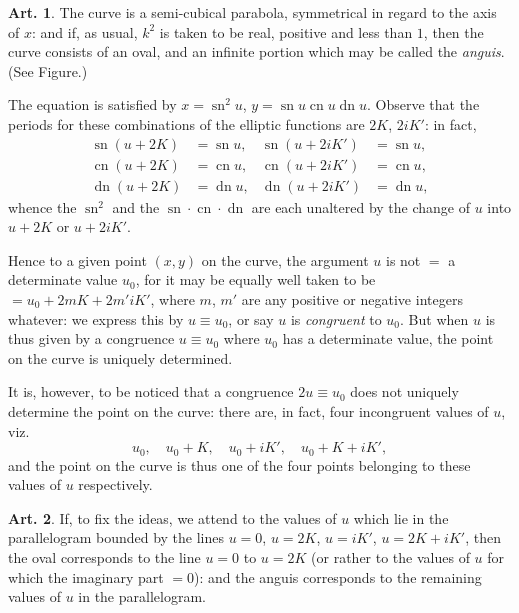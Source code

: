 \documentclass[12pt,a4paper]{article}
\theoremstyle{definition}
\newtheorem{art}{Art.}[section]
\DeclareMathOperator{\sn}{sn}
\DeclareMathOperator{\cn}{cn}
\DeclareMathOperator{\dn}{dn}
\begin{document}
\begin{art}\label{art:120}
The curve is a semi-cubical parabola, symmetrical in regard to the axis of $x$: and if, as usual, $k^2$ is taken to be real, positive and less than $1$, then the curve consists of an oval, and an infinite portion which may be called the \textit{anguis}. (See Figure.)

The equation is satisfied by $x = \sn^2 u$, $y = \sn u \cn u \dn u$. Observe that the periods for these combinations of the elliptic functions are $2K$, $2iK'$: in fact,
\begin{align*}
\sn(u + 2K) &= \sn u, & \sn(u + 2iK') &= \sn u,\\
\cn(u + 2K) &= \cn u, & \cn(u + 2iK') &= \cn u,\\
\dn(u + 2K) &= \dn u, & \dn(u + 2iK') &= \dn u,
\end{align*}
whence the $\sn^2$ and the $\sn \cdot \cn \cdot \dn$ are each unaltered by the change of $u$ into $u + 2K$ or $u + 2iK'$.

Hence to a given point $(x, y)$ on the curve, the argument $u$ is not $=$ a determinate value $u_0$, for it may be equally well taken to be $= u_0 + 2mK + 2m'iK'$, where $m$, $m'$ are any positive or negative integers whatever: we express this by $u \equiv u_0$, or say $u$ is \textit{congruent} to $u_0$. But when $u$ is thus given by a congruence $u \equiv u_0$ where $u_0$ has a determinate value, the point on the curve is uniquely determined.

It is, however, to be noticed that a congruence $2u \equiv u_0$ does not uniquely determine the point on the curve: there are, in fact, four incongruent values of $u$, viz.
\[
u_0, \quad u_0 + K, \quad u_0 + iK', \quad u_0 + K + iK',
\]
and the point on the curve is thus one of the four points belonging to these values of $u$ respectively.
\end{art}

\newpage
\begin{art}\label{art:121}
If, to fix the ideas, we attend to the values of $u$ which lie in the parallelogram bounded by the lines $u = 0$, $u = 2K$, $u = iK'$, $u = 2K + iK'$, then the oval corresponds to the line $u = 0$ to $u = 2K$ (or rather to the values of $u$ for which the imaginary part $= 0$): and the anguis corresponds to the remaining values of $u$ in the parallelogram.
\end{art}
\end{document}
